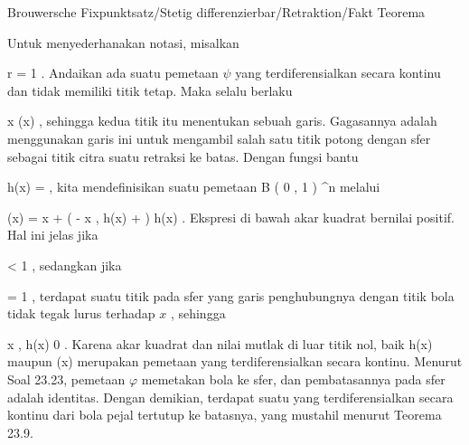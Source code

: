 {Brouwersche Fixpunktsatz/Stetig differenzierbar/Retraktion/Fakt}
{Teorema}
{}
{

\faktzusatz {}
\faktzusatz {}

}
{

Untuk menyederhanakan notasi, misalkan

\mavergleichskette
{\vergleichskette
{ r
}
{ = }{ 1
}
{  }{
}
{    }{
}
{   }{
}
}
{}{}{.}
Andaikan ada suatu pemetaan $\psi$ yang terdiferensialkan secara kontinu dan tidak memiliki titik tetap. Maka selalu berlaku

\mavergleichskettedisp
{\vergleichskette
{ x
}
{ \neq} { \psi(x)
}
{ } {
}
{ } {
}
{ } {
}
}
{}{}{,}
sehingga kedua titik itu menentukan sebuah garis. Gagasannya adalah menggunakan garis ini untuk mengambil salah satu
 {} {}
titik potong dengan sfer sebagai titik citra suatu retraksi ke batas. Dengan fungsi bantu

\mavergleichskettedisp
{\vergleichskette
{ h(x)
}
{ =} { {  }
}
{ } {
}
{ } {
}
{ } {
}
}
{}{}{,}
kita mendefinisikan suatu pemetaan
\maabbdisp {\varphi} { B  \left(  0 , 1 \right) } { \R^n
} {}
melalui

\mavergleichskettedisphandlinks
{\vergleichskettedisphandlinks
{ \varphi(x)
}
{ =} { x + \left(  - \left\langle  x  , h(x)  \right\rangle +   \right) \cdot h(x)
}
{ } {
}
{ } {
}
{ } {
}
}
{}{}{.}
Ekspresi di bawah akar kuadrat bernilai positif. Hal ini jelas jika

\mavergleichskette
{\vergleichskette
{  \Vert
}
{ < }{ 1
}
{  }{
}
{    }{
}
{   }{
}
}
{}{}{,}
sedangkan jika

\mavergleichskette
{\vergleichskette
{  \Vert
}
{ = }{ 1
}
{  }{
}
{    }{
}
{   }{
}
}
{}{}{,}
terdapat suatu titik pada sfer yang garis penghubungnya dengan titik bola
 tidak tegak lurus terhadap $x$
 {} {,}
sehingga

\mavergleichskettedisp
{\vergleichskette
{ \left\langle  x  , h(x)  \right\rangle
}
{ \neq} { 0
}
{ } {
}
{ } {
}
{ } {
}
}
{}{}{.}
Karena akar kuadrat dan nilai mutlak
di luar titik nol, baik
\mathkor {} {h(x)} {maupun} {\varphi(x)} {}
merupakan pemetaan yang terdiferensialkan secara kontinu. Menurut
Soal 23.23,
pemetaan $\varphi$ memetakan bola ke sfer, dan pembatasannya pada sfer adalah identitas. Dengan demikian, terdapat suatu
yang terdiferensialkan secara kontinu dari bola pejal tertutup ke batasnya, yang mustahil menurut
Teorema 23.9.

}
